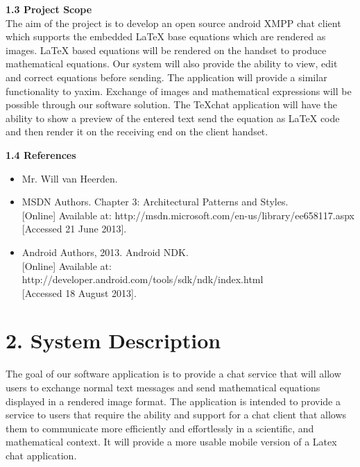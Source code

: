 \documentclass[29pt,a4paper]{moderncv}
\begin{document}
		\noindent \textbf{1.3 Project Scope}
			\\The aim of the project is to develop an open source android XMPP chat client which supports the embedded LaTeX base equations which are rendered as images. LaTeX based equations will be rendered on the handset to produce mathematical equations. Our system will also provide the ability to view, edit and correct equations before sending.
			\parindent 5mm The application will provide a similar functionality to yaxim. Exchange of images and mathematical expressions will be possible through our software solution. The TeXchat application will have the ability to show a preview of the entered text send the equation as LaTeX code and then render it on the receiving end on the client handset.
			
		\vspace{5mm}
		
	\noindent \textbf{1.4 References}
		\begin{itemize}
		\item Mr. Will van Heerden.
			\item MSDN Authors. Chapter 3: Architectural Patterns and Styles. 
			\\{[Online]} Available at: http://msdn.microsoft.com/en-us/library/ee658117.aspx
			\\{[Accessed 21 June 2013].}
			
			\item Android Authors, 2013. Android NDK.\\ {[Online]} Available at: http://developer.android.com/tools/sdk/ndk/index.html
				\\{[Accessed 18 August 2013].}
		\end{itemize}
		\vspace{5mm}
		
\newpage
	\section*{\textbf{2. System Description}}
		\vspace{4mm}
			\noindent The goal of our software application is to provide a chat service that will allow users to exchange normal text messages and send mathematical equations displayed in a rendered image format.  The application is intended to provide a service to users that require the ability and support for a chat client that allows them to communicate more efficiently and effortlessly in a scientific, and mathematical context. It will provide a more usable mobile version of a Latex chat application.\\ 
			
\end{document}
